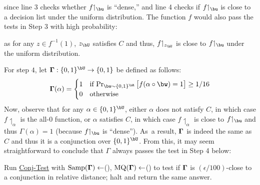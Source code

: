 \documentclass[11pt]{article}
\theoremstyle{definition}
\begin{document}
\noindent since line 3 checks whether $f{\upharpoonleft_{\bu}}$ is ``dense,'' and line 4 checks if $f{\upharpoonleft_{\bu}}$ is close to a decision list under the uniform distribution. The function
$f$ would also pass  the tests in Step 3 
 with high probability: \medskip

\begin{algorithm}[H]
\end{algorithm}\medskip
\noindent as for any $z\in f^{-1}(1)$, $z_{\bU}$ satisfies $C$ and thus,
$f{\upharpoonleft_{z_{\bU}}}$ is close to $f{\upharpoonleft_{\bu}}$ under the uniform distribution.

For step $4$, let $\bGamma:\{0,1\}^{\bU}\rightarrow \{0,1\}$ be
  defined as follows:
$$\bGamma(\alpha)=\begin{cases}
         1 & \text{if $\Pr_{\bw \sim \{0,1\}^{\bR} }\big[f(\alpha \circ \bw)=1\big] \ge 1/16$} \\
         0 &\text{otherwise}
    \end{cases}$$
Now, observe that for any $\alpha\in \{0,1\}^{\bU}$,  
  either $\alpha$ does not satisfy $C$, in which case
$f{\upharpoonleft_{\alpha}}$ is the all-$0$ function,
  or $\alpha$ satisfies $C$, in which case 
$f{\upharpoonleft_{\alpha}}$ is close to 
  $f{\upharpoonleft_{\bu}}$ and thus
  $\Gamma(\alpha)=1$ (because $f{\upharpoonleft_{\bu}}$ is ``dense'').
As~a result, $\mathbf{\Gamma}$ is indeed the same as $C$ and thus it is a conjunction over $\{0,1\}^{\bU}$. From this, it may seem straightforward to conclude that $\Gamma$
  always passes the test in Step 4 below:\medskip 
  
\begin{algorithm}[H]\begin{algorithmic}[1]\vspace{0.2cm}
    \setcounter{ALG@line}{6}
\State Run \hyperlink{Algorithm2}{\sc Conj-Test}
with $\mathrm{Samp}(\mathbf{\Gamma}) \leftarrow $(), $\mathrm{MQ}(\mathbf{\Gamma}) \leftarrow $()  to test if  
    $\mathbf{\Gamma}$ \Statex  is $(\epsilon/100)$-close to a conjunction in relative distance; halt and return the same answer. \vspace{0.15cm} 
    \end{algorithmic}
\end{algorithm}\medskip
\end{document}
